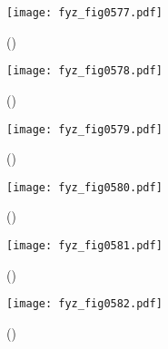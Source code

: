     \begin{figure}[ht!] %
      \centering
      \texttt{[image: fyz\_fig0577.pdf]}
      \caption{
               (\cite[s.~707]{Feynman02})}
      \label{fyz:fig0577}
    \end{figure}
    
    \begin{figure}[ht!] %
      \centering
      \texttt{[image: fyz\_fig0578.pdf]}
      \caption{
               (\cite[s.~707]{Feynman02})}
      \label{fyz:fig0578}
    \end{figure}

    \begin{figure}[ht!] %
      \centering
      \texttt{[image: fyz\_fig0579.pdf]}
      \caption{
               (\cite[s.~707]{Feynman02})}
      \label{fyz:fig0579}
    \end{figure}

    \begin{figure}[ht!] %
      \centering
      \texttt{[image: fyz\_fig0580.pdf]}
      \caption{
               (\cite[s.~707]{Feynman02})}
      \label{fyz:fig0580}
    \end{figure}
    
    \begin{figure}[ht!] %
      \centering
      \texttt{[image: fyz\_fig0581.pdf]}
      \caption{
               (\cite[s.~707]{Feynman02})}
      \label{fyz:fig0581}
    \end{figure}

    \begin{figure}[ht!] %
      \centering
      \texttt{[image: fyz\_fig0582.pdf]}
      \caption{
               (\cite[s.~707]{Feynman02})}
      \label{fyz:fig0582}
    \end{figure}

